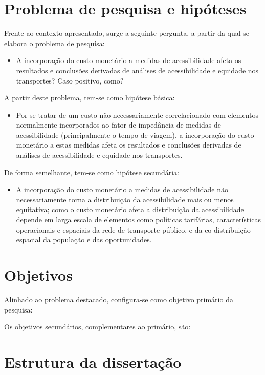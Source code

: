 \documentclass[msc,numbers]{coppe}
\providecommand{\tightlist}{%
  \setlength{\itemsep}{0pt}\setlength{\parskip}{0pt}}
\begin{document}
  \hypertarget{problema-de-pesquisa-e-hipuxf3teses}{%
  \section{Problema de pesquisa e hipóteses}\label{problema-de-pesquisa-e-hipuxf3teses}}

  Frente ao contexto apresentado, surge a seguinte pergunta, a partir da qual se elabora o problema de pesquisa:
  \begin{itemize}
  \tightlist
  \item
    A incorporação do custo monetário a medidas de acessibilidade afeta os resultados e conclusões derivadas de análises de acessibilidade e equidade nos transportes? Caso positivo, como?
  \end{itemize}
  A partir deste problema, tem-se como hipótese básica:
  \begin{itemize}
  \tightlist
  \item
    Por se tratar de um custo não necessariamente correlacionado com elementos normalmente incorporados ao fator de impedância de medidas de acessibilidade (principalmente o tempo de viagem), a incorporação do custo monetário a estas medidas afeta os resultados e conclusões derivadas de análises de acessibilidade e equidade nos transportes.
  \end{itemize}
  De forma semelhante, tem-se como hipótese secundária:
  \begin{itemize}
  \tightlist
  \item
    A incorporação do custo monetário a medidas de acessibilidade não necessariamente torna a distribuição da acessibilidade mais ou menos equitativa; como o custo monetário afeta a distribuição da acessibilidade depende em larga escala de elementos como políticas tarifárias, características operacionais e espaciais da rede de transporte público, e da co-distribuição espacial da população e das oportunidades.
  \end{itemize}
  \hypertarget{objetivos}{%
  \section{Objetivos}\label{objetivos}}

  Alinhado ao problema destacado, configura-se como objetivo primário da pesquisa:

  Os objetivos secundários, complementares ao primário, são:

  \hypertarget{estrutura-da-dissertauxe7uxe3o}{%
  \section{Estrutura da dissertação}\label{estrutura-da-dissertauxe7uxe3o}}
\end{document}
